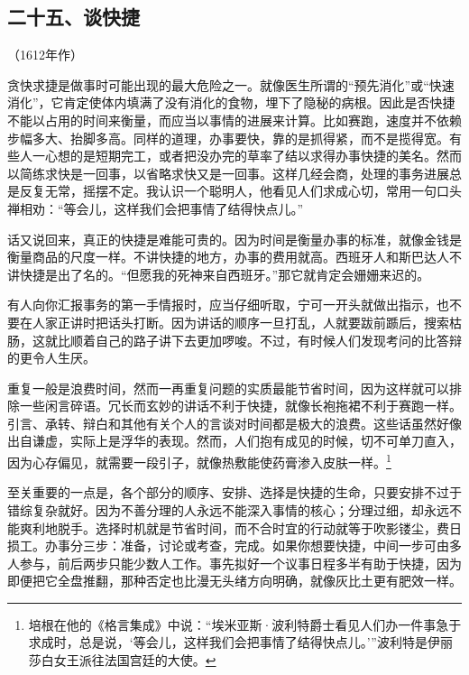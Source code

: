 \subsection*{二十五、谈快捷}
\begin{center}
    （1612年作）
\end{center}
\par 贪快求捷是做事时可能出现的最大危险之一。就像医生所谓的“预先消化”或“快速消化”，它肯定使体内填满了没有消化的食物，埋下了隐秘的病根。因此是否快捷不能以占用的时间来衡量，而应当以事情的进展来计算。比如赛跑，速度并不依赖步幅多大、抬脚多高。同样的道理，办事要快，靠的是抓得紧，而不是揽得宽。有些人一心想的是短期完工，或者把没办完的草率了结以求得办事快捷的美名。然而以简练求快是一回事，以省略求快又是一回事。这样几经会商，处理的事务进展总是反复无常，摇摆不定。我认识一个聪明人，他看见人们求成心切，常用一句口头禅相劝：“等会儿，这样我们会把事情了结得快点儿。”
\par 话又说回来，真正的快捷是难能可贵的。因为时间是衡量办事的标准，就像金钱是衡量商品的尺度一样。不讲快捷的地方，办事的费用就高。西班牙人和斯巴达人不讲快捷是出了名的。“但愿我的死神来自西班牙。”那它就肯定会姗姗来迟的。
\par 有人向你汇报事务的第一手情报时，应当仔细听取，宁可一开头就做出指示，也不要在人家正讲时把话头打断。因为讲话的顺序一旦打乱，人就要跋前踬后，搜索枯肠，这就比顺着自己的路子讲下去更加啰唆。不过，有时候人们发现考问的比答辩的更令人生厌。
\par 重复一般是浪费时间，然而一再重复问题的实质最能节省时间，因为这样就可以排除一些闲言碎语。冗长而玄妙的讲话不利于快捷，就像长袍拖裙不利于赛跑一样。引言、承转、辩白和其他有关个人的言谈对时间都是极大的浪费。这些话虽然好像出自谦虚，实际上是浮华的表现。然而，人们抱有成见的时候，切不可单刀直入，因为心存偏见，就需要一段引子，就像热敷能使药膏渗入皮肤一样。\footnote{培根在他的《格言集成》中说：“埃米亚斯·波利特爵士看见人们办一件事急于求成时，总是说，‘等会儿，这样我们会把事情了结得快点儿。’”波利特是伊丽莎白女王派往法国宫廷的大使。}
\par 至关重要的一点是，各个部分的顺序、安排、选择是快捷的生命，只要安排不过于错综复杂就好。因为不善分理的人永远不能深入事情的核心；分理过细，却永远不能爽利地脱手。选择时机就是节省时间，而不合时宜的行动就等于吹影镂尘，费日损工。办事分三步：准备，讨论或考查，完成。如果你想要快捷，中间一步可由多人参与，前后两步只能少数人工作。事先拟好一个议事日程多半有助于快捷，因为即便把它全盘推翻，那种否定也比漫无头绪方向明确，就像灰比土更有肥效一样。





